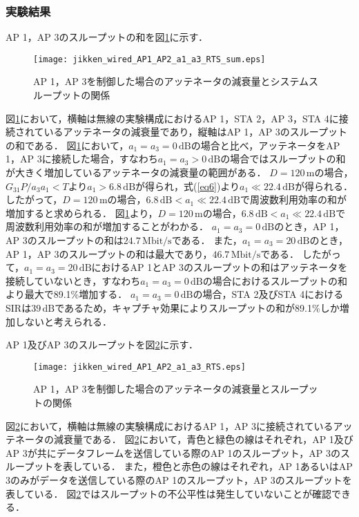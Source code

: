\documentclass[master]{kuisthesis}		%
\begin{document}
\subsubsection{実験結果}
AP 1，AP 3のスループットの和を図\ref{throughput_a1_a3_RTS_sum}に示す．
\ifnum {}
\begin{figure}[!t]
\centering
\texttt{[image: jikken\_wired\_AP1\_AP2\_a1\_a3\_RTS\_sum.eps]}
\caption{AP 1，AP 3を制御した場合のアッテネータの減衰量とシステムスループットの関係}
\label{throughput_a1_a3_RTS_sum}
\end{figure}
\fi
図\ref{throughput_a1_a3_RTS_sum}において，横軸は無線の実験構成におけるAP 1，STA 2，AP 3，STA 4に接続されているアッテネータの減衰量であり，縦軸はAP 1，AP 3のスループットの和である．
図\ref{throughput_a1_a3_RTS_sum}において，$a_1 = a_3 = 0\,\mathrm{dB}$の場合と比べ，アッテネータをAP 1，AP 3に接続した場合，すなわち$a_1 = a_3 > 0\,\mathrm{dB}$の場合ではスループットの和が大きく増加しているアッテネータの減衰量の範囲がある．
$D=120\,\mathrm{m}$の場合，$G_{31}P/a_3a_1<T$より$a_1>6.8\,\mathrm{dB}$が得られ，式(\ref{eq6})より$a_1 \ll 22.4\,\mathrm{dB}$が得られる．
したがって，$D=120\,\mathrm{m}$の場合，$6.8\,\mathrm{dB} < a_1 \ll 22.4\,\mathrm{dB}$で周波数利用効率の和が増加すると求められる．
図\ref{throughput_a1_a3_RTS_sum}より，$D=120\,\mathrm{m}$の場合，$6.8\,\mathrm{dB} < a_1 \ll 22.4\,\mathrm{dB}$で周波数利用効率の和が増加することがわかる．
$a_1=a_3=0\,\mathrm{dB}$のとき，AP 1，AP 3のスループットの和は$24.7\,\mathrm{Mbit/s}$である．
また，$a_1=a_3=20\,\mathrm{dB}$のとき，AP 1，AP 3のスループットの和は最大であり，$46.7\,\mathrm{Mbit/s}$である．
したがって，$a_1=a_3=20\,\mathrm{dB}$におけるAP 1とAP 3のスループットの和はアッテネータを接続していないとき，すなわち$a_1=a_3=0\,\mathrm{dB}$の場合におけるスループットの和より最大で89.1\%増加する．
$a_1=a_3=0\,\mathrm{dB}$の場合，STA 2及びSTA 4におけるSIRは$39\,\mathrm{dB}$であるため，キャプチャ効果によりスループットの和が89.1\%しか増加しないと考えられる．

AP 1及びAP 3のスループットを図\ref{throughput_a1_a3_RTS}に示す．
\ifnum {}
\begin{figure}[!t]
\centering
\texttt{[image: jikken\_wired\_AP1\_AP2\_a1\_a3\_RTS.eps]}
\caption{AP 1，AP 3を制御した場合のアッテネータの減衰量とスループットの関係}
\label{throughput_a1_a3_RTS}
\end{figure}
\fi
図\ref{throughput_a1_a3_RTS}において，横軸は無線の実験構成におけるAP 1，AP 3に接続されているアッテネータの減衰量である．
図\ref{throughput_a1_a3_RTS}において，青色と緑色の線はそれぞれ，AP 1及びAP 3が共にデータフレームを送信している際のAP 1のスループット，AP 3のスループットを表している．
また，橙色と赤色の線はそれぞれ，AP 1あるいはAP 3のみがデータを送信している際のAP 1のスループット，AP 3のスループットを表している．
図\ref{throughput_a1_a3_RTS}ではスループットの不公平性は発生していないことが確認できる．
\end{document}
